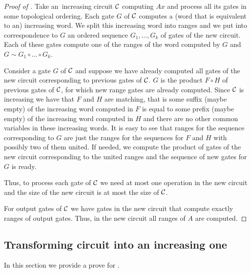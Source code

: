 \begin{proof}[Proof of {}]
    Take an~increasing circuit ${\cal C}$ computing $Ax$ and process all its gates in some topological ordering. Each gate $G$ of ${\cal C}$ computes a (word that is equivalent to an) increasing word. We split this increasing word into ranges and we put into correspondence to $G$ an ordered sequence $G_1,\ldots, G_k$ of gates of the new circuit. Each of these gates compute one of the ranges of the word computed by $G$ and $G \sim G_1\circ\ldots \circ G_k$.

    Consider a gate $G$ of ${\cal C}$ and suppose we have already computed all gates of the new circuit corresponding to previous gates of ${\cal C}$. $G$ is the product $F \circ H$ of previous gates of ${\cal C}$, for which new range gates are already computed. Since ${\cal C}$ is increasing we have that $F$ and $H$ are matching, that is some suffix (maybe empty) of the increasing word computed in $F$ is equal to some prefix (maybe empty) of the increasing word computed in $H$ and there are no other common variables in these increasing words. It is easy to see that ranges for the sequence corresponding to $G$ are just the ranges for the sequences for $F$ and $H$ with possibly two of them united. If needed, we compute the product of gates of the new circuit corresponding to the united ranges and the sequence of new gates for $G$ is ready.

    Thus, to process each gate of ${\cal C}$ we need at most one operation in the new circuit and the size of the new circuit is at most the size of ${\cal C}$.

    For output gates of ${\cal C}$ we have gates in the new circuit that compute exactly ranges of output gates. Thus, in the new circuit all ranges of $A$ are computed.
\end{proof}

%

%
%

%

%

%

%
%


\subsection{Transforming circuit into an increasing one}
\label{sec:increasing_circuits}

%
In this section we provide a prove for .
%

